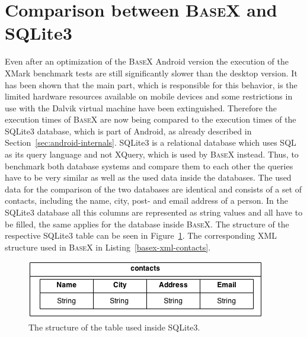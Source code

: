 \section{Comparison between \textsc{BaseX} and SQLite3}
\label{sec:comparison-between-basex-and-sqlite}
Even after an optimization of the \textsc{BaseX} Android version the execution of the XMark benchmark tests are still significantly slower than the desktop version.
It has been shown that the main part, which is responsible for this behavior, is the limited hardware resources available on mobile devices and some restrictions in use with the Dalvik virtual machine have been extinguished.
Therefore the execution times of \textsc{BaseX} are now being compared to the execution times of the SQLite3 database, which is part of Android, as already described in Section~\ref{sec:android-internals}.
SQLite3 is a relational database which uses SQL as its query language and not XQuery, which is used by \textsc{BaseX} instead.
Thus, to benchmark both database systems and compare them to each other the queries have to be very similar as well as the used data inside the databases.
The used data for the comparison of the two databases are identical and consists of a set of contacts, including the name, city, post- and email address of a person.
In the SQLite3 database all this columns are represented as string values and all have to be filled, the same applies for the database inside \textsc{BaseX}.
The structure of the respective SQLite3 table can be seen in Figure~\ref{fig:sqlite-tables-contacts}.
The corresponding XML structure used in \textsc{BaseX} in Listing~\ref{basex-xml-contacts}.

\begin{figure}[h]
\begin{center}
\includegraphics[scale=0.65]{images/sqlite-tables.png} 
\caption{The structure of the table used inside SQLite3.}
\label{fig:sqlite-tables-contacts}
\end{center}
\end{figure}




